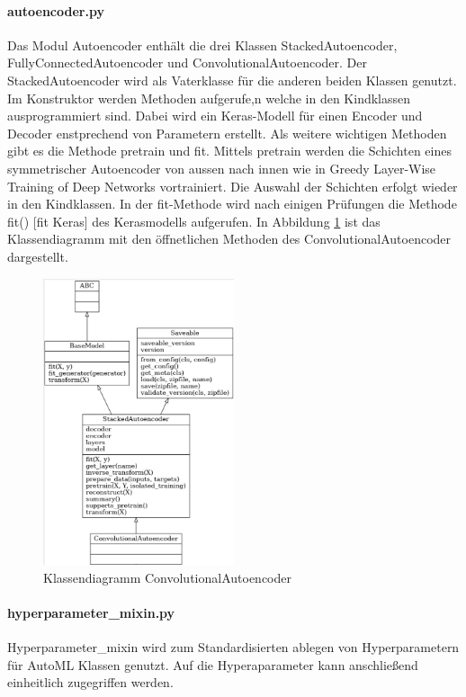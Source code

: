 	\paragraph{autoencoder.py} Das Modul Autoencoder enthält die drei Klassen StackedAutoencoder, FullyConnectedAutoencoder und ConvolutionalAutoencoder. Der StackedAutoencoder wird als Vaterklasse für die anderen beiden Klassen genutzt. Im Konstruktor werden Methoden aufgerufe,n welche in den Kindklassen ausprogrammiert sind. Dabei wird ein Keras-Modell für einen Encoder und Decoder enstprechend von Parametern  erstellt. Als weitere wichtigen Methoden gibt es die Methode pretrain und fit. Mittels pretrain werden die Schichten eines symmetrischer Autoencoder von aussen nach innen wie in 	 Greedy Layer-Wise Training of Deep Networks  vortrainiert. Die Auswahl der Schichten erfolgt wieder in den Kindklassen.
	In der fit-Methode wird nach einigen Prüfungen die Methode fit() 		[fit Keras] des Kerasmodells aufgerufen. In Abbildung \ref{img:KlassendiagrammConvolutionalAutoencoder} ist das Klassendiagramm mit den öffnetlichen Methoden des ConvolutionalAutoencoder dargestellt. 
	\begin{figure}[h]
		\centering
		\includegraphics[width=0.5\textwidth, center]{bilder/Grundlagen/klassendiagramm_public_cae.png}
		\caption[Klassendiagramm ConvolutionalAutoencoder]{Klassendiagramm ConvolutionalAutoencoder}
		\label{img:KlassendiagrammConvolutionalAutoencoder}
	\end{figure}  
	
	\paragraph{hyperparameter\_mixin.py}  Hyperparameter\_mixin wird zum Standardisierten ablegen von Hyperparametern für AutoML Klassen genutzt. Auf die Hyperaparameter kann anschließend einheitlich zugegriffen werden.
	

